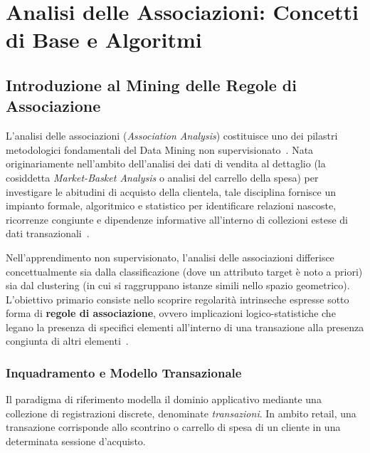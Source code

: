 \chapter{Analisi delle Associazioni: Concetti di Base e Algoritmi}
\label{chap:dm-association-analysis}

\FloatBarrier
\section{Introduzione al Mining delle Regole di Associazione}
\label{sec:dm-association-intro}

L'analisi delle associazioni (\textit{Association Analysis}) costituisce uno dei pilastri metodologici fondamentali del Data Mining non supervisionato~\cite{tan2018}. Nata originariamente nell'ambito dell'analisi dei dati di vendita al dettaglio (la cosiddetta \textit{Market-Basket Analysis} o analisi del carrello della spesa) per investigare le abitudini di acquisto della clientela, tale disciplina fornisce un impianto formale, algoritmico e statistico per identificare relazioni nascoste, ricorrenze congiunte e dipendenze informative all'interno di collezioni estese di dati transazionali~\cite{agrawal1993, agrawal1994}.

Nell'apprendimento non supervisionato, l'analisi delle associazioni differisce concettualmente sia dalla classificazione (dove un attributo target è noto a priori) sia dal clustering (in cui si raggruppano istanze simili nello spazio geometrico). L'obiettivo primario consiste nello scoprire regolarità intrinseche espresse sotto forma di \textbf{regole di associazione}, ovvero implicazioni logico-statistiche che legano la presenza di specifici elementi all'interno di una transazione alla presenza congiunta di altri elementi~\cite{tan2018, agrawal1993}.

\FloatBarrier
\subsection{Inquadramento e Modello Transazionale}
Il paradigma di riferimento modella il dominio applicativo mediante una collezione di registrazioni discrete, denominate \textit{transazioni}. In ambito retail, una transazione corrisponde allo scontrino o carrello di spesa di un cliente in una determinata sessione d'acquisto.

